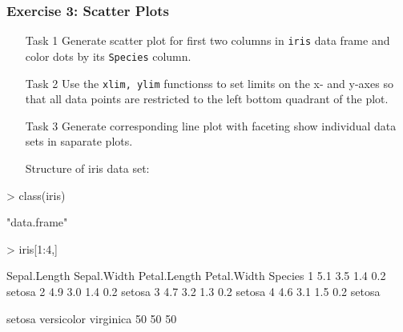 \documentclass{beamer}
\newcommand{\Rfunction}[1]{{\texttt{#1}}}
\newcommand{\Rfunarg}[1]{{\texttt{#1}}}
\begin{document}
\begin{frame}[containsverbatim]  
	\frametitle{Exercise 3: Scatter Plots}
\scriptsize
\begin{itemize}
        \item[Task 1] Generate scatter plot for first two columns in \Rfunction{iris} data frame and color dots by its \Rfunction{Species} column.
        \item[Task 2] Use the \Rfunarg{xlim, ylim} functionss to set limits on the x- and y-axes so that all data points are restricted to the left bottom quadrant of the plot. 
        \item[Task 3] Generate corresponding line plot with faceting show individual data sets in saparate plots. 
        \item[]\hspace{-1.1cm} Structure of iris data set:
\end{itemize}
\begin{Schunk}
\begin{Sinput}
> class(iris)
\end{Sinput}
\begin{Soutput}
[1] "data.frame"
\end{Soutput}
\begin{Sinput}
> iris[1:4,]
\end{Sinput}
\begin{Soutput}
  Sepal.Length Sepal.Width Petal.Length Petal.Width Species
1          5.1         3.5          1.4         0.2  setosa
2          4.9         3.0          1.4         0.2  setosa
3          4.7         3.2          1.3         0.2  setosa
4          4.6         3.1          1.5         0.2  setosa
\end{Soutput}
\begin{Soutput}
    setosa versicolor  virginica 
        50         50         50 
\end{Soutput}
\end{Schunk}
\end{frame}
\end{document}
